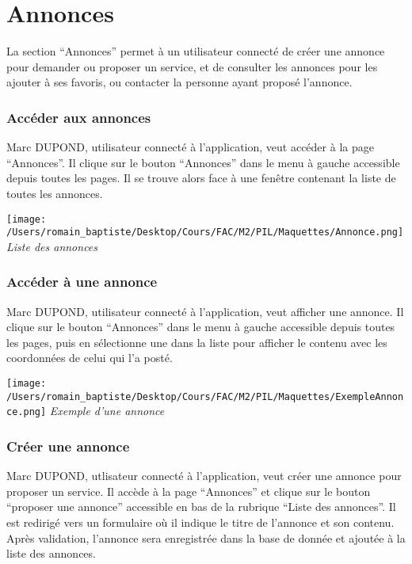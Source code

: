 \section*{Annonces}
La section “Annonces” permet à un utilisateur connecté de créer une annonce pour demander ou proposer un service, et de consulter les annonces pour les ajouter à ses favoris, ou contacter la personne ayant proposé l’annonce.
\subsubsection*{Accéder aux annonces}
Marc DUPOND, utilisateur connecté à l’application, veut accéder à la page “Annonces”. Il clique sur le bouton “Annonces” dans le menu à gauche accessible depuis toutes les pages. Il se trouve alors face à une fenêtre contenant la liste de toutes les annonces. 
\begin{center}
\texttt{[image: /Users/romain\_baptiste/Desktop/Cours/FAC/M2/PIL/Maquettes/Annonce.png]}
\emph{Liste des annonces}
\end{center}
\subsubsection*{Accéder à une annonce}
Marc DUPOND, utilisateur connecté à l’application, veut afficher une annonce. Il clique sur le bouton “Annonces” dans le menu à gauche accessible depuis toutes les pages, puis en sélectionne une dans la liste pour afficher le contenu avec les coordonnées de celui qui l’a posté.
\begin{center}
\texttt{[image: /Users/romain\_baptiste/Desktop/Cours/FAC/M2/PIL/Maquettes/ExempleAnnonce.png]}
\emph{Exemple d'une annonce}
\end{center}
\subsubsection*{Créer une annonce}
Marc DUPOND, utlisateur connecté à l’application, veut créer une annonce pour proposer un service. Il accède à la page “Annonces” et clique sur le bouton “proposer une annonce” accessible en bas de la rubrique “Liste des annonces”. Il est redirigé vers un formulaire où il indique le titre de l’annonce et son contenu. Après validation, l’annonce sera enregistrée dans la base de donnée et ajoutée à la liste des annonces.
